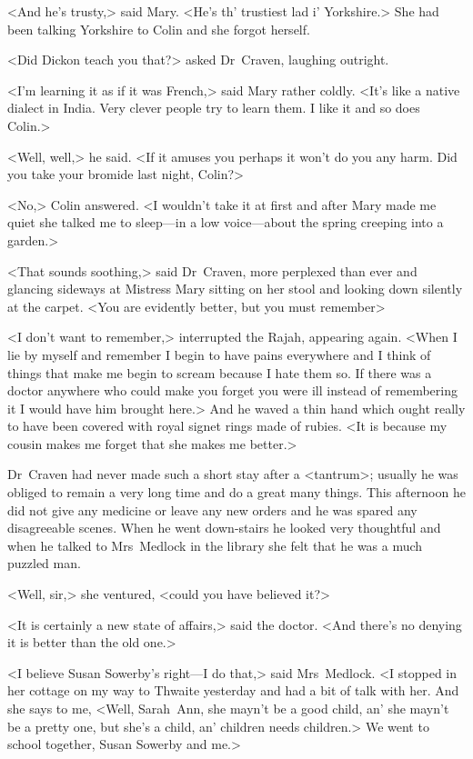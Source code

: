<And he's trusty,> said Mary. <He's th' trustiest lad i' Yorkshire.> She had been talking Yorkshire to Colin and she forgot herself.

<Did Dickon teach you that?> asked Dr~Craven, laughing outright.

<I'm learning it as if it was French,> said Mary rather coldly. <It's like a native dialect in India. Very clever people try to learn them. I like it and so does Colin.>

<Well, well,> he said. <If it amuses you perhaps it won't do you any harm. Did you take your bromide last night, Colin?>

<No,> Colin answered. <I wouldn't take it at first and after Mary made me quiet she talked me to sleep—in a low voice—about the spring creeping into a garden.>

<That sounds soothing,> said Dr~Craven, more perplexed than ever and glancing sideways at Mistress Mary sitting on her stool and looking down silently at the carpet. <You are evidently better, but you must remember\longdash>

<I don't want to remember,> interrupted the Rajah, appearing again. <When I lie by myself and remember I begin to have pains everywhere and I think of things that make me begin to scream because I hate them so. If there was a doctor anywhere who could make you forget you were ill instead of remembering it I would have him brought here.> And he waved a thin hand which ought really to have been covered with royal signet rings made of rubies. <It is because my cousin makes me forget that she makes me better.>

Dr~Craven had never made such a short stay after a <tantrum>; usually he was obliged to remain a very long time and do a great many things. This afternoon he did not give any medicine or leave any new orders and he was spared any disagreeable scenes. When he went down-stairs he looked very thoughtful and when he talked to Mrs~Medlock in the library she felt that he was a much puzzled man.

<Well, sir,> she ventured, <could you have believed it?>

<It is certainly a new state of affairs,> said the doctor. <And there's no denying it is better than the old one.>

<I believe Susan Sowerby's right—I do that,> said Mrs~Medlock. <I stopped in her cottage on my way to Thwaite yesterday and had a bit of talk with her. And she says to me, <Well, Sarah~Ann, she mayn't be a good child, an' she mayn't be a pretty one, but she's a child, an' children needs children.> We went to school together, Susan Sowerby and me.>

